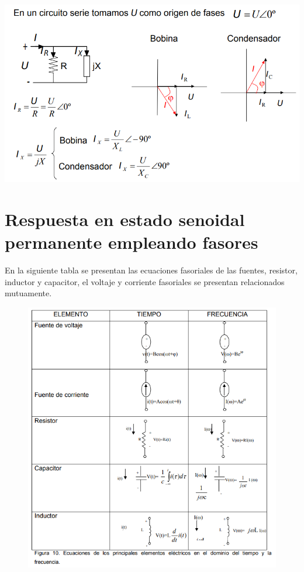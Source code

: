 \documentclass{mylib/reporte}
\begin{document}
\includegraphics[scale=0.5]{img/circ_expo/image1}

\section{Respuesta en estado senoidal permanente empleando fasores}

En la siguiente tabla se presentan las ecuaciones fasoriales de las fuentes, resistor, inductor y capacitor, el voltaje y corriente fasoriales se presentan relacionados mutuamente.

\begin{figure}[H]
	\centering
	\includegraphics[scale=0.4]{img/circ_expo/image8}
\end{figure}
\end{document}

